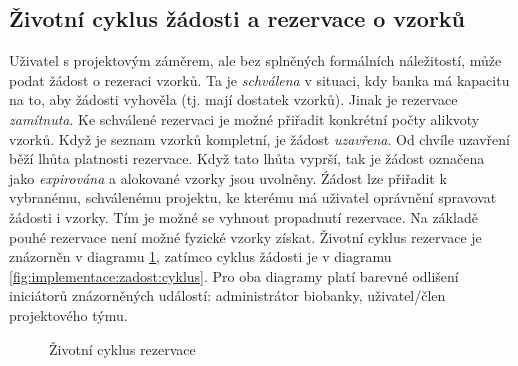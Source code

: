 \subsection{Životní cyklus žádosti a rezervace o vzorků}
Uživatel s projektovým záměrem, ale bez splněných formálních náležitostí, může podat žádost o rezeraci vzorků. Ta je \textit{schválena} v situaci, kdy banka má kapacitu na to, aby žádosti vyhověla (tj. mají dostatek vzorků). Jinak je rezervace \textit{zamítnuta}. Ke schválené rezervaci je možné přiřadit konkrétní počty alikvoty vzorků. Když je seznam vzorků kompletní, je žádost \textit{uzavřena}. Od chvíle uzavření běží lhůta platnosti rezervace. Když tato lhůta vyprší, tak je žádost označena jako \textit{expirována} a alokované vzorky jsou uvolněny.
Źádost lze přiřadit k vybranému, schválenému projektu, ke kterému má uživatel oprávnění spravovat žádosti i vzorky. Tím je možné se vyhnout propadnutí rezervace. 
Na základě pouhé rezervace není možné fyzické vzorky získat. Životní cyklus rezervace je znázorněn v diagramu \ref{fig:implementace:rezervace:cyklus}, zatímco cyklus žádosti je v diagramu \ref{fig:implementace:zadost:cyklus}. Pro oba diagramy platí barevné odlišení iniciátorů znázorněných událostí: {\color{palatinatepurple}administrátor biobanky}, {\color{cyan}uživatel}/{\color{cyan}člen projektového týmu}. 

\begin{figure}[hbtp]
\begin{center}
\caption{Životní cyklus rezervace}
\label{fig:implementace:rezervace:cyklus}
\end{center}
\end{figure}

